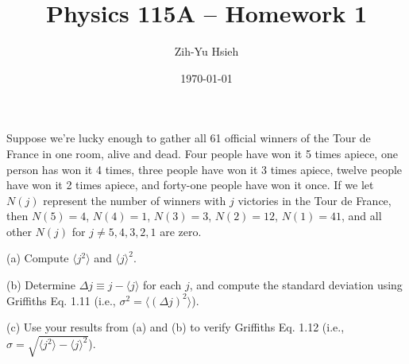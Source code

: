 \documentclass{article}
\title{Physics 115A -- Homework 1}
\author{Zih-Yu Hsieh}
\date{\today}
\begin{document}
\maketitle

\begin{ques}\label{q1}
Suppose we’re lucky enough to gather all 61 official winners of the Tour de France in one
room, alive and dead. Four people have won it 5 times apiece, one person has won it 4
times, three people have won it 3 times apiece, twelve people have won it 2 times apiece, and
forty-one people have won it once. If we let $N(j)$ represent the number of winners with $j$
victories in the Tour de France, then $N(5) = 4$, $N(4) = 1$, $N(3) = 3$, $N(2) = 12$, $N(1) = 41$,
and all other $N(j)$ for $j \neq 5, 4, 3, 2, 1$ are zero.

(a) Compute $\langle j^2\rangle$ and $\langle j\rangle^2$.

(b) Determine $\Delta j \equiv j-\langle j\rangle$ for each $j$, and compute the standard deviation using Griffiths
Eq. 1.11 (i.e., $\sigma^2 = \langle (\Delta j)^2\rangle$).

(c) Use your results from (a) and (b) to verify Griffiths Eq. 1.12 (i.e., $\sigma =
\sqrt{\langle j^2\rangle - \langle j\rangle^2}$).
\end{ques}
\end{document}
